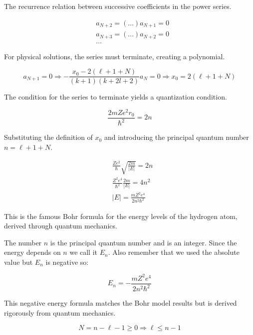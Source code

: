 \documentclass[italian]{HKNdocument}
\begin{document}
The recurrence relation between successive coefficients in the power series.

\begin{align}
& a_{N+2}=(\ldots) a_{N+1}=0 \\
& a_{N+3}=(\ldots) a_{N+2}=0  \label{eq:9.62}\\
& \ldots
\end{align}

For physical solutions, the series must terminate, creating a polynomial.

\begin{equation}
a_{N+1}=0 \Longrightarrow-\frac{x_{0}-2(\ell+1+N)}{(k+1)(k+2 l+2)} a_{N}=0 \Longrightarrow x_{0}=2(\ell+1+N) \label{eq:9.63}
\end{equation}

The condition for the series to terminate yields a quantization condition.

\begin{equation}
\frac{2 m Z e^{2} r_{0}}{\hbar^{2}}=2 n \label{eq:9.64}
\end{equation}

Substituting the definition of $x_0$ and introducing the principal quantum number $n = \ell+1+N$.

\begin{align}
& \frac{Z e^{2}}{\hbar} \sqrt{\frac{2 m}{|E|}}=2 n \\
& \frac{Z^{2} e^{4}}{\hbar^{2}} \frac{2 m}{|E|}=4 n^{2}  \label{eq:9.65}\\
& |E|=\frac{m Z^{2} e^{4}}{2 n^{2} \hbar^{2}}
\end{align}

This is the famous Bohr formula for the energy levels of the hydrogen atom, derived through quantum mechanics.

The number $n$ is the principal quantum number and is an integer. Since the energy depends on $n$ we call it $E_{n}$. Also remember that we used the absolute value but $E_{n}$ is negative so:

\begin{equation}
E_{n}=-\frac{m Z^{2} e^{4}}{2 n^{2} \hbar^{2}} \label{eq:9.66}
\end{equation}

This negative energy formula matches the Bohr model results but is derived rigorously from quantum mechanics.

\begin{equation}
N=n-\ell-1 \geq 0 \Longrightarrow \ell \leq n-1 \label{eq:9.67}
\end{equation}
\end{document}
